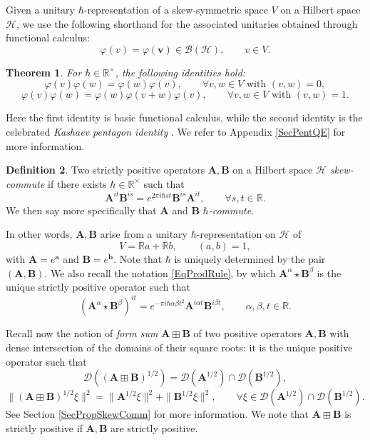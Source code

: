 \documentclass[11pt, reqno]{amsart}
\newtheorem{theorem}{Theorem}[section]
\theoremstyle{definition}
\newtheorem{defn}[theorem]{Definition}
\numberwithin{equation}{section}
\def\msD{\mathscr D}
\def\Hc{\mathcal H}
\def\R{\mathbb R}
\newcommand{\Hsp}{\mathcal{H}}
\newcommand{\Bc}{\mathcal{B}}
\newcommand{\vb}{\mathbf{v}}
\newcommand{\Ab}{\mathbf{A}}
\newcommand{\Bb}{\mathbf{B}}
\begin{document}
Given a unitary $\hbar$-representation of a skew-symmetric space $V$ on a Hilbert space $\Hc$, we use the following shorthand for the associated unitaries obtained through functional calculus: 
\begin{equation}\label{EqAbbrFuncCalc}
\varphi(v) = \varphi(\vb)\in \Bc(\Hsp),\qquad v\in V.
\end{equation}
\begin{theorem}\label{TheoPentagon}
For $\hbar\in \R^{\times}$, the following identities hold: 
\begin{equation}\label{EqCommComm}
\varphi(v)\varphi(w) = \varphi(w)\varphi(v),\qquad \forall v,w\in V \textrm{ with }(v,w) = 0,
\end{equation}
\begin{equation}\label{EqCommKashaev}
\varphi(v)\varphi(w) = \varphi(w)\varphi(v+w)\varphi(v),\qquad \forall v,w\in V \textrm{ with }(v,w) = 1.
\end{equation}
\end{theorem}
Here the first identity is basic functional calculus, while the second identity is the celebrated \emph{Kashaev pentagon identity} \cite{FK94,Wor00,FKV01}. We refer to Appendix \ref{SecPentQE} for more information. 

\begin{defn}
Two strictly positive operators $\Ab,\Bb$ on a Hilbert space $\Hc$ \emph{skew-commute} if there exists $\hbar \in \R^{\times}$ such that
\begin{equation}\label{EqSkewCommDef}
\Ab^{it}\Bb^{is} = e^{2\pi i \hbar st}\Bb^{is}\Ab^{it},\qquad \forall s,t\in \R.
\end{equation}
We then say more specifically that $\Ab$ and $\Bb$ \emph{$\hbar$-commute}.
\end{defn}
In other words, $\Ab,\Bb$ arise from a unitary $\hbar$-representation on $\Hc$ of 
\[
V = \R a+ \R b,\qquad (a,b)=1,
\]
with $\Ab = e^{\mathbf{a}}$ and $\Bb = e^{\mathbf{b}}$. Note that $\hbar$ is uniquely determined by the pair $(\Ab,\Bb)$. We also recall the notation \eqref{EqProdRule}, by which $\Ab^{\alpha}\star\Bb^{\beta}$ is the unique strictly positive operator such that 
\begin{equation}\label{EqStarProd}
(\Ab^{\alpha}\star\Bb^{\beta})^{it} = e^{-\pi i\hbar \alpha \beta t^2}\Ab^{i\alpha t}\Bb^{i\beta t},\qquad \alpha,\beta,t\in\R. 
\end{equation}

Recall now the notion of \emph{form sum} $\Ab \boxplus \Bb$ of two positive operators $\Ab,\Bb$ with dense intersection of the domains of their square roots: it is the unique positive operator such that 
\[
\msD((\Ab\boxplus \Bb)^{1/2}) = \msD(\Ab^{1/2})\cap \msD(\Bb^{1/2}),
\]
\[
\|(\Ab\boxplus \Bb)^{1/2}\xi\|^2 = \|\Ab^{1/2}\xi\|^2+ \|\Bb^{1/2}\xi\|^2,\qquad \forall \xi\in \msD(\Ab^{1/2})\cap \msD(\Bb^{1/2}).
\]
See Section \ref{SecPropSkewComm} for more information. We note that $\Ab\boxplus \Bb$ is strictly positive if $\Ab,\Bb$ are strictly positive.
\end{document}
